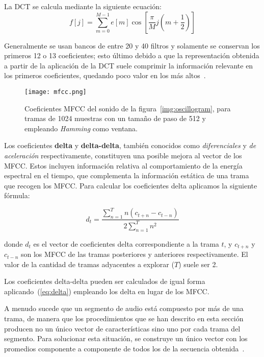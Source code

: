 La DCT se calcula mediante la siguiente ecuación:
\begin{equation}
    \label{eq:DCT}
    f[j] = \sum_{m=0}^{M-1}{e[m]\cos{\left[ \frac{\pi}{M}j\left( m + \frac{1}{2} \right) \right]}}
\end{equation}

Generalmente se usan bancos de entre 20 y 40 filtros y solamente se conservan los primeros 12 o 13 coeficientes;
esto último debido a que la representación obtenida a partir de la aplicación de la DCT suele comprimir la información relevante en los primeros coeficientes, quedando poco valor en los más altos~\cite{Davis80}.

\begin{figure}[!h]
    \centering
    \texttt{[image: mfcc.png]}
    \caption{Coeficientes MFCC del sonido de la figura~\ref{img:oscillogram}, para tramas de 1024 muestras con un tamaño de paso de 512 y empleando \textit{Hamming} como ventana.}
    \label{img:mfcc}
\end{figure}

Los coeficientes \textbf{delta} y \textbf{delta-delta}, también conocidos como \textit{diferenciales} y \textit{de aceleración} respectivamente,
constituyen una posible mejora al vector de los MFCC.
Estos incluyen información relativa al comportamiento de la energía espectral en el tiempo, que complementa la información estática de una trama que recogen los MFCC.
Para calcular los coeficientes delta aplicamos la siguiente fórmula:

\begin{equation}
    \label{eq:delta}
    d_t = \frac{\sum_{n=1}^{T}{n(c_{t+n} - c_{t-n})}}{2\sum_{n=1}^{T}{n^2}}
\end{equation}

\noindent
donde $d_t$ es el vector de coeficientes delta correspondiente a la trama $t$, y $c_{t+n}$ y $c_{t-n}$ son los MFCC de las tramas posteriores y anteriores respectivamente.
El valor de la cantidad de tramas adyacentes a explorar ($T$) suele ser 2.

Los coeficientes delta-delta pueden ser calculados de igual forma aplicando~(\ref{eq:delta}) empleando los delta en lugar de los MFCC.

A menudo sucede que un segmento de audio está compuesto por más de una trama, de manera que los procedimientos que se han descrito en esta sección producen no un único vector de características sino uno por cada trama del segmento.
Para solucionar esta situación, se construye un único vector con los promedios componente a componente de todos los de la secuencia obtenida~\cite{Lee06,Fagerlund07}.